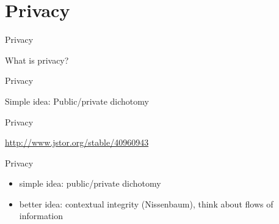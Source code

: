\documentclass{beamer}
\def\vf{\vfill}
\begin{document}
\section{Privacy}

\begin{frame}{Privacy}

What is privacy?

\end{frame}
\begin{frame}{Privacy}

Simple idea: Public/private dichotomy

\end{frame}
\begin{frame}{Privacy}

\begin{center}
\end{center}

\vf
\tiny{\url{http://www.jstor.org/stable/40960943}}

\end{frame}
\begin{frame}{Privacy}

\begin{itemize}
\item simple idea: public/private dichotomy
\item better idea: contextual integrity (Nissenbaum), think about flows of information
\end{itemize}

\end{frame}
\end{document}
